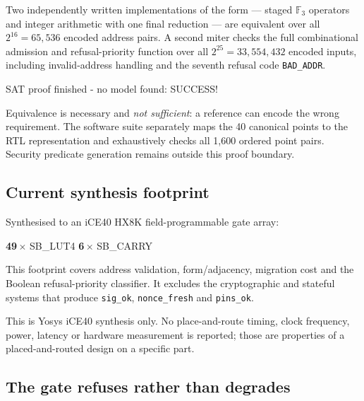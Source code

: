 \documentclass[11pt,letterpaper]{article}
\newcommand{\tagbox}[3]{\tikz[baseline=(X.base)]{\node[inner xsep=3.5pt,inner ysep=1.4pt,rounded corners=1.6pt,fill=#1,text=#2,font=\bfseries\sffamily\tiny] (X) {#3};}}
\newcommand{\PROVED}{\tagbox{greenlite}{green!45!black}{PROVED}}
\newcommand{\MEASURED}{\tagbox{cyanlite}{cyan!55!black}{MEASURED}}
\newcommand{\bignum}[2]{{\color{navy}\bfseries\Large #1}\,{\footnotesize\color{grey}#2}}
\begin{document}
Two independently written implementations of the form --- staged $\mathbb F_3$
operators and integer arithmetic with one final reduction --- are equivalent
over all $2^{16}=65{,}536$ encoded address pairs. A second miter checks the full
combinational admission and refusal-priority function over all
$2^{25}=33{,}554{,}432$ encoded inputs, including invalid-address handling and
the seventh refusal code \texttt{BAD\_ADDR}. \PROVED

\begin{center}
\begin{tcolorbox}[enhanced,colback=greenlite,colframe=green,boxrule=1pt,arc=2pt,width=0.86\textwidth,halign=center,fontupper=\ttfamily]
SAT proof finished - no model found: SUCCESS!
\end{tcolorbox}
\end{center}

Equivalence is necessary and \emph{not sufficient}: a reference can encode the
wrong requirement. The software suite separately maps the 40 canonical points
to the RTL representation and exhaustively checks all 1{,}600 ordered point
pairs. Security predicate generation remains outside this proof boundary.

\subsection{Current synthesis footprint}

Synthesised to an iCE40 HX8K field-programmable gate array:

\begin{center}
\bignum{49}{$\times$ SB\_LUT4} \hspace{1.2cm}
\bignum{6}{$\times$ SB\_CARRY} \hfill \MEASURED
\end{center}

This footprint covers address validation, form/adjacency, migration cost and
the Boolean refusal-priority classifier. It excludes the cryptographic and
stateful systems that produce \texttt{sig\_ok}, \texttt{nonce\_fresh} and
\texttt{pins\_ok}.

\begin{warnbox}
This is Yosys iCE40 synthesis only. No place-and-route timing, clock frequency,
power, latency or hardware measurement is reported; those are properties of a
placed-and-routed design on a specific part.
\end{warnbox}

\subsection{The gate refuses rather than degrades}
\end{document}

